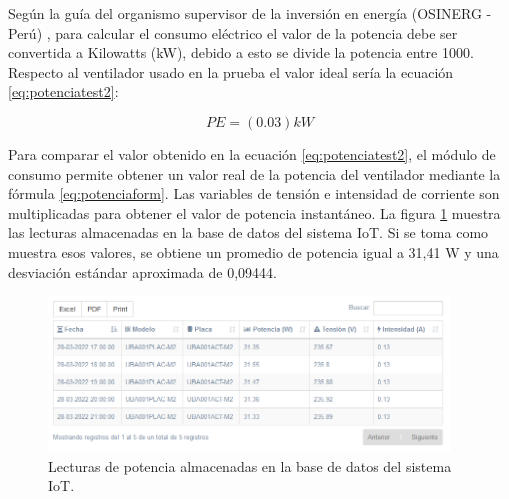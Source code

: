 Según la guía del organismo supervisor de la inversión en energía (OSINERG - Perú) \citep{BOOK:3}, para calcular el consumo eléctrico el valor de la potencia debe ser convertida a Kilowatts (kW), debido a esto se divide la potencia entre 1000. Respecto al ventilador usado en la prueba el valor ideal sería la ecuación \ref{eq:potenciatest2}:

\begin{equation}
	\label{eq:potenciatest2}
	PE = \left( 0.03 \right) kW
\end{equation}

Para comparar el valor obtenido en la ecuación \ref{eq:potenciatest2}, el módulo de consumo permite obtener un valor real de la potencia del ventilador mediante la fórmula \ref{eq:potenciaform}. Las variables de tensión e intensidad de corriente son multiplicadas para obtener el valor de potencia instantáneo. La figura \ref{fig:registroPotencia} muestra las lecturas almacenadas en la base de datos del sistema IoT. Si se toma como muestra esos valores, se obtiene un promedio de potencia igual a 31,41 W y una desviación estándar aproximada de 0,09444.

\begin{figure}[htpb]
\centering 
\includegraphics[width=0.95\textwidth]{./Figures/test/consumo/lecturas.png}
\caption{Lecturas de potencia almacenadas en la base de datos del sistema IoT.}
\label{fig:registroPotencia}
\end{figure}



